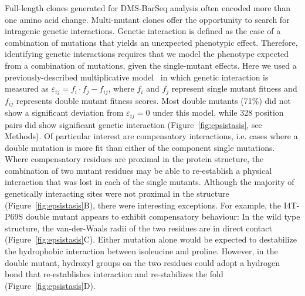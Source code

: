 Full-length  clones generated for DMS-BarSeq analysis often encoded more than one amino acid change. Multi-mutant clones offer the opportunity to search for intragenic genetic interactions. Genetic interaction is defined as the case of a combination of mutations that yields an unexpected phenotypic effect. Therefore, identifying genetic interactions requires that we model the phenotype expected from a combination of mutations, given the single-mutant effects.  Here we used a previously-described multiplicative model~\cite{phillips_language_1998,onge_systematic_2007} in which genetic interaction is measured as $\varepsilon_{ij} = f_i \cdot f_j - f_{ij}$, where $f_i$ and $f_j$ represent single mutant fitness and $f_{ij}$ represents double mutant fitness scores. Most double mutants (71\%) did not show a significant deviation from $\varepsilon_{ij} = 0$ under this model, while 328 position pairs did show significant genetic interaction (Figure~\ref{fig:epsistasis}, see Methods). Of particular interest are compensatory interactions, i.e. cases where a double mutation is more fit than either of the component single mutations.  Where compensatory residues are proximal in the protein structure, the combination of two mutant residues may be able to re-establish a physical interaction that was lost in each of the single mutants. Although the majority of genetically interacting sites were not proximal in the structure (Figure~\ref{fig:epsistasis}B), there were interesting exceptions. For example, the I4T-P69S double mutant appears to exhibit compensatory behaviour: In the wild type structure, the van-der-Waals radii of the two residues are in direct contact (Figure~\ref{fig:epsistasis}C). Either mutation alone would be expected to destabilize the hydrophobic interaction between isoleucine and proline.  However, in the double mutant, hydroxyl groups on the two residues could adopt a hydrogen bond that re-establishes interaction and re-stabilizes the fold (Figure~\ref{fig:epsistasis}D).

